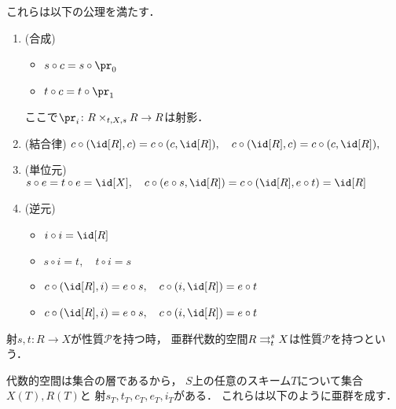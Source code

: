 \begin{Def}
        これらは以下の公理を満たす．
        \begin{enumerate}[label=(\Alph*)]
        \item (合成)
            \begin{itemize}
                \item $s\circ c=s\circ \pr_{0}$
                \item $t\circ c=t\circ \pr_{1}$
            \end{itemize}
            ここで$\pr_i \colon R\times _{t,X,s} R\to R$は射影．
        \item
            (結合律)
            $c\circ (\id[R], c)=c\circ (c, \id[R]), \quad
            c\circ (\id[R], c)=c\circ (c, \id[R]),$
        \item
            (単位元)
            $s\circ e=t\circ e=\id[X], \quad
             c\circ (e\circ s,\id[R])=c\circ (\id[R],e\circ t)=\id[R]$
         \item
            (逆元)
            \begin{itemize}
                \item $i\circ i=\id[R]$
                \item $s\circ i=t,\quad t\circ i=s$
                \item $c\circ (\id[R],i)=e\circ s,\quad c\circ (i,\id[R])=e\circ t$
                \item $c\circ (\id[R],i)=e\circ s,\quad c\circ (i,\id[R])=e\circ t$
            \end{itemize}
        \end{enumerate}

        射$s,t \colon R \to X$が性質$\mathcal{P}$を持つ時，
        亜群代数的空間$R \mathrel{\mathop{\rightrightarrows}^{s}_{t}} X$は性質$\mathcal{P}$を持つという．
    \end{Def}

    代数的空間は集合の層であるから，
    $S$上の任意のスキーム$T$について集合$X(T), R(T)$と
    射$s_T, t_T, c_T, e_T, i_T$がある．
    これらは以下のように亜群を成す．

